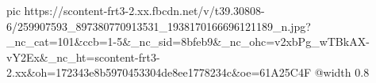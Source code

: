  
 
 
 
 

\ifcmt
  pic https://scontent-frt3-2.xx.fbcdn.net/v/t39.30808-6/259907593_897380770913531_1938170166696121189_n.jpg?_nc_cat=101&ccb=1-5&_nc_sid=8bfeb9&_nc_ohc=v2xbPg_wTBkAX-vY2Ex&_nc_ht=scontent-frt3-2.xx&oh=172343e8b5970453304de8ee1778234c&oe=61A25C4F
  @width 0.8
\fi
